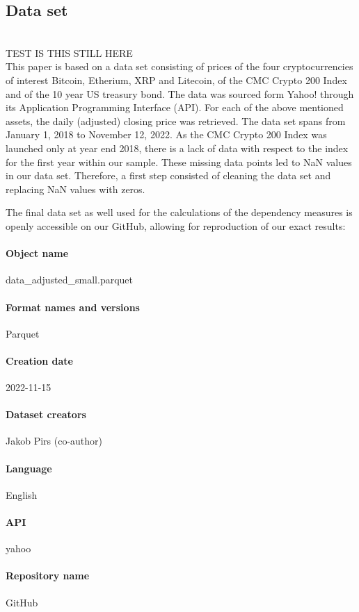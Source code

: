 \subsection{Data set}
\\

TEST IS THIS STILL HERE
\\

This paper is based on a data set consisting of prices of the four cryptocurrencies of interest Bitcoin, Etherium, XRP and Litecoin, of the CMC Crypto 200 Index and of the 10 year US treasury bond. The data was sourced form Yahoo! through its Application Programming Interface (API). For each of the above mentioned assets, the daily (adjusted) closing price was retrieved. The data set spans from January 1, 2018 to November 12, 2022. As the CMC Crypto 200 Index was launched only at year end 2018, there is a lack of data with respect to the index for the first year within our sample. These missing data points led to NaN values in our data set. Therefore, a first step consisted of cleaning the data set and replacing NaN values with zeros.

The final data set as well used for the calculations of the dependency measures is openly accessible on our GitHub, allowing for reproduction of our exact results:
\paragraph{Object name} data\_adjusted\_small.parquet
\paragraph{Format names and versions} Parquet
\paragraph{Creation date} 2022-11-15
\paragraph{Dataset creators} Jakob Pirs (co-author)
\paragraph{Language} English
\paragraph{API} yahoo 
\paragraph{Repository name} GitHub 
